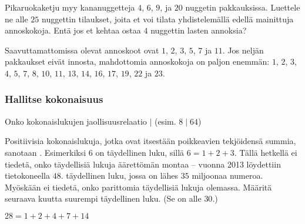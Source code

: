 \begin{tehtavasivu}
\begin{tehtava}
Pikaruokaketju myy kananuggetteja $4$, $6$, $9$, ja $20$ nuggetin pakkauksissa. Luettele ne alle $25$ nuggettin tilaukset, joita et voi tilata yhdistelemällä edellä mainittuja annoskokoja. Entä jos et kehtaa ostaa $4$ nuggettin lasten annoksia?
	\begin{vastaus}
		Saavuttamattomissa olevat annoskoot ovat $1$, $2$, $3$, $5$, $7$ ja $11$. Jos neljän pakkaukset eivät innosta, mahdottomia annoskokoja on paljon enemmän: $1$, $2$, $3$, $4$, $5$, $7$, $8$, $10$, $11$, $13$, $14$, $16$, $17$, $19$, $22$ ja $23$.
	\end{vastaus}
\end{tehtava}

\subsubsection*{Hallitse kokonaisuus}

\begin{tehtava}
Onko kokonaislukujen jaollisuusrelaatio $\mid$ (esim. $8\mid 64$)
	\begin{vastaus}
	\end{vastaus}
\end{tehtava}

\begin{tehtava}
Positiivisia kokonaislukuja, jotka ovat itsestään poikkeavien tekjöidensä summia, sanotaan . Esimerkiksi $6$ on täydellinen luku, sillä $6=1+2+3$. Tällä hetkellä ei tiedetä, onko täydellisiä lukuja äärettömän montaa -- vuonna 2013 löydettiin tietokoneella $48.$ täydellinen luku, jossa on lähes $35$ miljoonaa numeroa. Myöskään ei tiedetä, onko parittomia täydellisiä lukuja olemassa.
Määritä seuraava kuutta suurempi täydellinen luku. (Se on alle $30$.)
	\begin{vastaus}
$28=1+2+4+7+14$
	\end{vastaus}
\end{tehtava}


\end{tehtavasivu}
